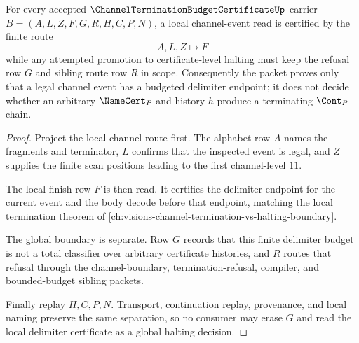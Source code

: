 \begin{theorem}\label{thm:channel-termination-budget-certificate-local-global-boundary}
For every accepted $\ChannelTerminationBudgetCertificateUp$ carrier $B=(A,L,Z,F,G,R,H,C,P,N)$, a local channel-event read is certified by the finite route
$$
A,L,Z \longmapsto F
$$
while any attempted promotion to certificate-level halting must keep the refusal row $G$ and sibling route row $R$ in scope. Consequently the packet proves only that a legal channel event has a budgeted delimiter endpoint; it does not decide whether an arbitrary $\NameCert_{P}$ and history $h$ produce a terminating $\Cont_{P}$-chain.
\end{theorem}
\begin{proof}
Project the local channel route first. The alphabet row $A$ names the fragments and terminator, $L$ confirms that the inspected event is legal, and $Z$ supplies the finite scan positions leading to the first channel-level $11$.

The local finish row $F$ is then read. It certifies the delimiter endpoint for the current event and the body decode before that endpoint, matching the local termination theorem of \autoref{ch:visions-channel-termination-vs-halting-boundary}.

The global boundary is separate. Row $G$ records that this finite delimiter budget is not a total classifier over arbitrary certificate histories, and $R$ routes that refusal through the channel-boundary, termination-refusal, compiler, and bounded-budget sibling packets.

Finally replay $H,C,P,N$. Transport, continuation replay, provenance, and local naming preserve the same separation, so no consumer may erase $G$ and read the local delimiter certificate as a global halting decision.
\end{proof}



